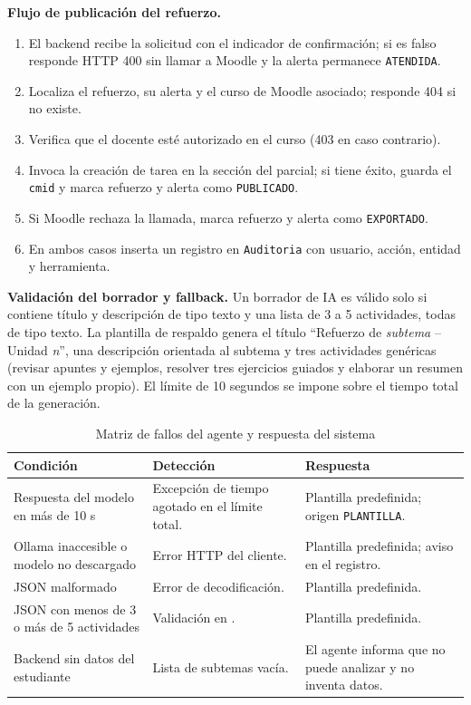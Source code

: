 \documentclass[11pt,a4paper]{article}
\newcommand{\hd}[1]{\textbf{#1}}
\begin{document}
\textbf{Flujo de publicación del refuerzo.}
\begin{enumerate}
  \item El backend recibe la solicitud con el indicador de confirmación; si es falso responde HTTP 400 sin llamar a Moodle y la alerta permanece \texttt{ATENDIDA}.
  \item Localiza el refuerzo, su alerta y el curso de Moodle asociado; responde 404 si no existe.
  \item Verifica que el docente esté autorizado en el curso (403 en caso contrario).
  \item Invoca la creación de tarea en la sección del parcial; si tiene éxito, guarda el \texttt{cmid} y marca refuerzo y alerta como \texttt{PUBLICADO}.
  \item Si Moodle rechaza la llamada, marca refuerzo y alerta como \texttt{EXPORTADO}.
  \item En ambos casos inserta un registro en \texttt{Auditoria} con usuario, acción, entidad y herramienta.
\end{enumerate}

\textbf{Validación del borrador y fallback.} Un borrador de IA es válido solo si contiene título y descripción de tipo texto y una lista de 3 a 5 actividades, todas de tipo texto. La plantilla de respaldo genera el título ``Refuerzo de \emph{subtema} -- Unidad \emph{n}'', una descripción orientada al subtema y tres actividades genéricas (revisar apuntes y ejemplos, resolver tres ejercicios guiados y elaborar un resumen con un ejemplo propio). El límite de 10 segundos se impone sobre el tiempo total de la generación.

\begin{table}[H]
\centering\small
\caption{Matriz de fallos del agente y respuesta del sistema}
\begin{tabularx}{\textwidth}{|R{4.2cm}|R{4.4cm}|Y|}
\hline
\hd{Condición} & \hd{Detección} & \hd{Respuesta}\\ \hline
Respuesta del modelo en más de 10 s & Excepción de tiempo agotado en el límite total. & Plantilla predefinida; origen \texttt{PLANTILLA}.\\ \hline
Ollama inaccesible o modelo no descargado & Error HTTP del cliente. & Plantilla predefinida; aviso en el registro.\\ \hline
JSON malformado & Error de decodificación. & Plantilla predefinida.\\ \hline
JSON con menos de 3 o más de 5 actividades & Validación en . & Plantilla predefinida.\\ \hline
Backend sin datos del estudiante & Lista de subtemas vacía. & El agente informa que no puede analizar y no inventa datos.\\ \hline
\end{tabularx}
\end{table}
\end{document}

